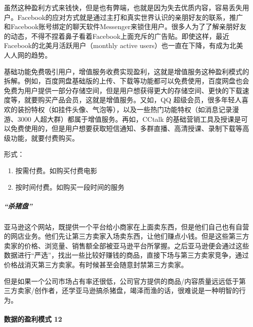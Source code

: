 \documentclass[letterpaper,11pt,english]{sphinxmanual}
\begin{document}
虽然这种盈利方式来钱快，但是也有弊端，也就是因为失去优质内容，容易丢失用户。Facebook的应对方式就是通过主打和真实世界认识的亲朋好友的联系，推广和Facebook账号绑定的聊天软件Messenger来锁住用户。很多人为了了解亲朋好友的动态，不得不捏着鼻子看着Facebook上面充斥的广告贴。即使这样，最近Facebook的北美月活跃用户（monthly
active users）也一直在下降，有成为北美人人网的趋势。

基础功能免费吸引用户，增值服务收费实现盈利，这就是增值服务这种盈利模式的拆解。例如，百度网盘基础版的上传、下载等功能都可以免费使用，百度网盘也会免费为用户提供一部分存储空间，但是用户想获得更大的存储空间、更快的下载速度等，就要购买产品会员，这就是增值服务。又如，QQ
超级会员，很多年轻人喜欢的装扮特权（如挂件头像、气泡等），以及一些热门功能特权（如消息记录漫游、3000
人超大群）都属于增值服务。再如，CCtalk
的基础营销工具及授课是可以免费使用的，但是用户想要获取短信通知、多群直播、高清授课、录制下载等高级功能，就要付费购买。

形式：
\begin{enumerate}
%
\item {} 
按需付费。如购买付费电影

\item {} 
按时间付费。如购买一段时间的服务

\end{enumerate}


\subparagraph{“杀猪盘”}
\label{\detokenize{chapter_introduction/money:id15}}
亚马逊这个网站，既提供一个平台给小商家在上面卖东西，但是他们自己也有自营的网店业务。他们先让第三方卖家入场卖东西，让他们赚点小钱。但是这些第三方卖家的价格、浏览量、销售额全部被亚马逊平台所掌握。之后亚马逊便会通过这些数据进行“严选”，找出一些比较好赚钱的商品，直接下场与第三方卖家竞争，通过价格战消灭第三方卖家。有时候甚至会随意封禁第三方卖家。

但是如果一个公司市场占有率还很低，公司官方提供的商品/内容质量远远低于第三方卖家/创作者，还学亚马逊搞杀猪盘，竭泽而渔的话，很难说是一种明智的行为。


\paragraph{数据的盈利模式 12\sphinxfootnotemark[116]}
\label{\detokenize{chapter_introduction/money:id16}}%
\begin{footnotetext}[116]\sphinxAtStartFootnote
{}
%
\end{footnotetext}\ignorespaces 
\end{document}
